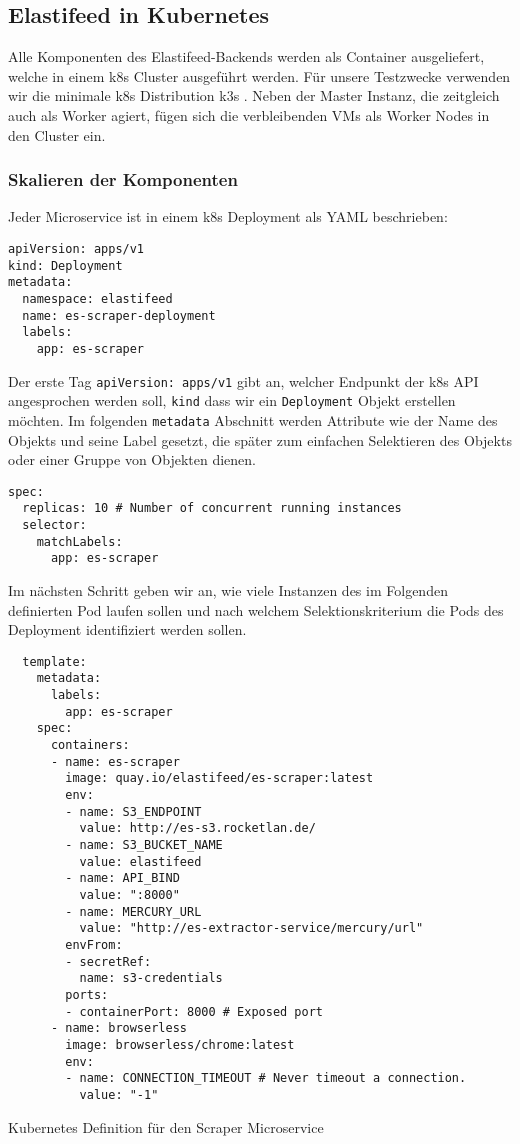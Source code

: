\subsection{Elastifeed in Kubernetes}

Alle Komponenten des Elastifeed-Backends werden als Container ausgeliefert, welche in einem \ac{k8s} Cluster ausgeführt werden.
Für unsere Testzwecke verwenden wir die minimale \ac{k8s} Distribution k3s \cite{k3s}.
Neben der Master Instanz, die zeitgleich auch als Worker agiert, fügen sich die verbleibenden VMs als Worker Nodes in den Cluster ein.

\subsubsection{Skalieren der Komponenten}

Jeder Microservice ist in einem \ac{k8s} Deployment als YAML beschrieben:
\begin{verbatim}
apiVersion: apps/v1
kind: Deployment
metadata:
  namespace: elastifeed
  name: es-scraper-deployment
  labels:
    app: es-scraper
\end{verbatim}
Der erste Tag \texttt{apiVersion: apps/v1} gibt an, welcher Endpunkt der \ac{k8s} API angesprochen werden soll, \texttt{kind} dass wir ein \texttt{Deployment} Objekt erstellen möchten.
Im folgenden \texttt{metadata} Abschnitt werden Attribute wie der Name des Objekts und seine Label gesetzt, die später zum einfachen Selektieren des Objekts oder einer Gruppe von Objekten dienen.

\begin{verbatim}
spec:
  replicas: 10 # Number of concurrent running instances
  selector:
    matchLabels:
      app: es-scraper
\end{verbatim}

Im nächsten Schritt geben wir an, wie viele Instanzen des im Folgenden definierten Pod laufen sollen und nach welchem Selektionskriterium die Pods des Deployment identifiziert werden sollen.

\begin{listing}[h]
\begin{verbatim}
  template:
    metadata:
      labels:
        app: es-scraper
    spec:
      containers:
      - name: es-scraper
        image: quay.io/elastifeed/es-scraper:latest
        env:
        - name: S3_ENDPOINT
          value: http://es-s3.rocketlan.de/
        - name: S3_BUCKET_NAME
          value: elastifeed
        - name: API_BIND
          value: ":8000"
        - name: MERCURY_URL
          value: "http://es-extractor-service/mercury/url"
        envFrom:
        - secretRef:
          name: s3-credentials
        ports:
        - containerPort: 8000 # Exposed port
      - name: browserless
        image: browserless/chrome:latest
        env:
        - name: CONNECTION_TIMEOUT # Never timeout a connection.
          value: "-1"
\end{verbatim}
\caption{Kubernetes Definition für den Scraper Microservice}
\label{deployment:code:scraper}
\end{listing}

